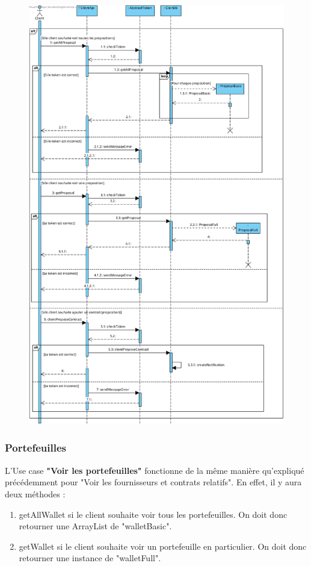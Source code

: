 \newpage
\begin{figure}[h]
\centering
\includegraphics[width = 1.2\textwidth]{Base/sequence/img/client/Voir les fournisseurs et contrats relatifs.png}
\end{figure}

\newpage

\subsubsection{Portefeuilles}
\begin{flushleft}
L'Use case \textbf{"Voir les portefeuilles"} fonctionne de la même manière qu'expliqué précédemment pour "Voir les fournisseurs et contrats relatifs".
En effet, il y aura deux méthodes : 
\end{flushleft}
\begin{enumerate}
\item getAllWallet si le client souhaite voir tous les portefeuilles. On doit donc retourner une ArrayList de "walletBasic".
\item getWallet si le client souhaite voir un portefeuille en particulier. On doit donc retourner une instance de "walletFull".
\end{enumerate}

